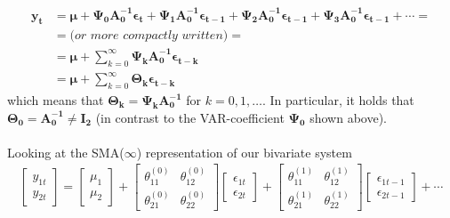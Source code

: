 \documentclass[a4paper,11pt,listof=nochaptergap,oneside,pointednumbers,bibtotoc,bigheadings,liststotoc]{scrbook}
\theoremstyle{mysatz}
\theoremstyle{mydefinition}
\theoremstyle{mybemerkung}
\newcommand{\vect}[1]{\boldsymbol{\mathbf{#1}}}
\begin{document}
\begin{equation} \label{eq:svar8}
\begin{split}
 			\vect{y_t} & = \vect{\mu} + \vect{\Psi_0}\vect{A_0^{-1}}\vect{\epsilon_t} + \vect{\Psi_1}\vect{A_0^{-1}}\vect{\epsilon_{t-1}} + \vect{\Psi_{2}}\vect{A_0^{-1}}\vect{\epsilon_{t-1}} + \vect{\Psi_{3}}\vect{A_0^{-1}}\vect{\epsilon_{t-1}} + \cdots = \\
			& = \textit{(or more compactly written)} = \\
			& = \vect{\mu} + \sum\limits_{k=0}^\infty \vect{\Psi_k}\vect{A_0^{-1}}\vect{\epsilon_{t-k}} \\
			& = \vect{\mu} + \sum\limits_{k=0}^\infty \vect{\Theta_k}\vect{\epsilon_{t-k}}
\end{split}								
\end{equation}
which means that $\vect{\Theta_k} = \vect{\Psi_k}\vect{A_0^{-1}}$ for $k = 0, 1, \dots$. In particular, it holds that $\vect{\Theta_0}=\vect{A_0^{-1}} \neq \vect{I_2}$ (in contrast to the VAR-coefficient $\vect{\Psi_0}$ shown above). \\
\\
Looking at the SMA($\infty$) representation of our bivariate system 
\begin{equation} \label{eq:svar9}
\begin{split}
	\begin{bmatrix}
    	y_{1t} \\
    	y_{2t}
 	\end{bmatrix} 
	=
	\begin{bmatrix}
    	\mu_1 \\
    	\mu_2
 	\end{bmatrix} + 
	\begin{bmatrix}
    	\theta_{11}^{(0)} & \theta_{12}^{(0)}\\
    	\theta_{21}^{(0)} & \theta_{22}^{(0)}
 	\end{bmatrix} 
	\begin{bmatrix}
    	\epsilon_{1t} \\
	\epsilon_{2t}
 	\end{bmatrix} + 
	\begin{bmatrix}
    	\theta_{11}^{(1)} & \theta_{12}^{(1)}\\
    	\theta_{21}^{(1)} & \theta_{22}^{(1)}
 	\end{bmatrix} 
	\begin{bmatrix}
    	\epsilon_{1t-1} \\
	\epsilon_{2t-1}
 	\end{bmatrix} + \cdots 
\end{split}								
\end{equation}
\end{document}
